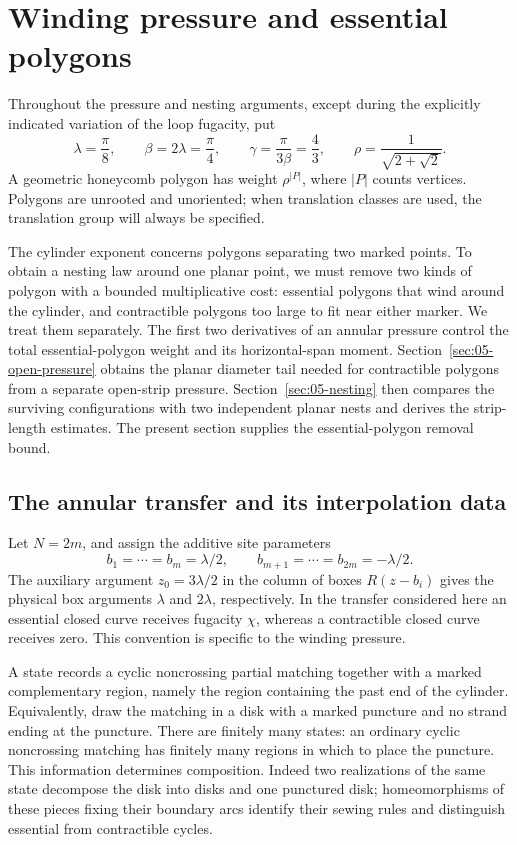 \section{Winding pressure and essential polygons}
\label{sec:05-pressure}

Throughout the pressure and nesting arguments, except during the explicitly
indicated variation of the loop fugacity, put
\[
 \lambda=\frac{\pi}{8},\qquad \beta=2\lambda=\frac{\pi}{4},
 \qquad \gamma=\frac{\pi}{3\beta}=\frac43,
 \qquad \rho=\frac1{\sqrt{2+\sqrt2}}.
\]
A geometric honeycomb polygon has weight \(\rho^{|P|}\), where
\(|P|\) counts vertices. Polygons are unrooted and unoriented; when
translation classes are used, the translation group will always be specified.

The cylinder exponent concerns polygons separating two marked points.
To obtain a nesting law around one planar point, we must remove two
kinds of polygon with a bounded multiplicative cost: essential polygons
that wind around the cylinder, and contractible polygons too large to fit
near either marker. We treat them separately. The first two derivatives
of an annular pressure control the total essential-polygon weight and
its horizontal-span moment. Section~\ref{sec:05-open-pressure} obtains the planar diameter tail
needed for contractible polygons from a separate open-strip pressure.
Section~\ref{sec:05-nesting} then compares the surviving configurations
with two independent planar nests and derives the strip-length estimates.
The present section supplies the essential-polygon removal bound.

\subsection{The annular transfer and its interpolation data}

Let \(N=2m\), and assign the additive site parameters
\[
 b_1=\cdots=b_m=\lambda/2,
 \qquad b_{m+1}=\cdots=b_{2m}=-\lambda/2.
\]
The auxiliary argument \(z_0=3\lambda/2\) in the column of boxes \(R(z-b_i)\) gives the physical box arguments \(\lambda\) and \(2\lambda\), respectively. In the transfer considered here an essential closed curve receives fugacity \(\chi\), whereas a contractible closed curve receives zero. This convention is specific to the winding pressure.

A state records a cyclic noncrossing partial matching together with a marked complementary region, namely the region containing the past end of the cylinder. Equivalently, draw the matching in a disk with a marked puncture and no strand ending at the puncture. There are finitely many states: an ordinary cyclic noncrossing matching has finitely many regions in which to place the puncture. This information determines composition. Indeed two realizations of the same state decompose the disk into disks and one punctured disk; homeomorphisms of these pieces fixing their boundary arcs identify their sewing rules and distinguish essential from contractible cycles.

